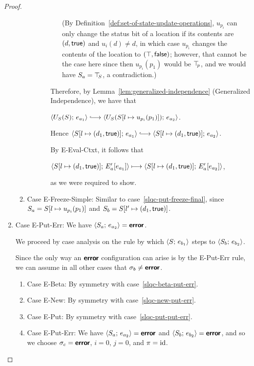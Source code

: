 \begin{proof}
\begin{enumerate}
\begin{enumerate}
\begin{itemize}
\begin{itemize}
\begin{itemize}
            (By Definition~\ref{def:set-of-state-update-operations},
            $u_{p_i}$ can only change the status bit of a location if
            its contents are $(d, \textsf{true})$ and $u_i(d) \neq
            d$, in which case $u_{p_i}$ changes the contents of the
            location to $(\top, \textsf{false})$; however, that
            cannot be the case here since then $u_{p_i}(p_1)$ would be
            $\top\hspace{-0.85mm}_{p}$, and we would have $S_a = \top\hspace{-0.85mm}_{S}$, a
            contradiction.)
          \end{itemize}
          Therefore, by Lemma~\ref{lem:generalized-independence}
          (Generalized Independence), we have that

          $\config{U_S(S)}{e_{a_1}} \parstepsto
          \config{U_S(\extSRaw{S}{l}{u_{p_i}(p_1)})}{e_{a_2}}$.

          Hence $\config{\extS{S}{l}{d_1}{\frozentrue}}{e_{a_1}}
          \parstepsto
          \config{\extS{S}{l}{d_1}{\frozentrue}}{e_{a_2}}$.

          By {\sc E-Eval-Ctxt}, it follows that

          $\langle S[l \mapsto (d_1, \textsf{true})];\, E'_a\hspace{-0.5mm}\left[e_{a_1}\right] \rangle
          \longmapsto
          \langle S[l \mapsto (d_1, \textsf{true})];\, E'_a\hspace{-0.5mm}\left[e_{a_2}\right] \rangle$,

          as we were required to show.
        \end{itemize}

      \end{itemize}

    \item \label{slqc-put-freeze-simple}Case {\sc E-Freeze-Simple}:
      Similar to case~\ref{slqc-put-freeze-final}, since $S_a =
      S[l \mapsto u_{p_i}(p_1)]$ and $S_b =
      S[l' \mapsto (d_1, \textsf{true})]$.

    \end{enumerate}
  \item Case {\sc E-Put-Err}: We have $\langle S_a;\, e_{a_2} \rangle =
    \textbf{\textsf{error}}$.

    We proceed by case analysis on the rule by which
    $\langle S;\, e_{b_1} \rangle$ steps to $\langle S_b;\, e_{b_2} \rangle$.

    Since the only way an $\textbf{\textsf{error}}$ configuration can arise is by the
    {\sc E-Put-Err} rule, we can assume in all other cases that
    $\sigma_b \neq \textbf{\textsf{error}}$.
    \begin{enumerate}
    \item \label{slqc-put-err-beta}Case {\sc E-Beta}: By symmetry with case~\ref{slqc-beta-put-err}.
    \item \label{slqc-put-err-new}Case {\sc E-New}: By symmetry with case~\ref{slqc-new-put-err}.
    \item \label{slqc-put-err-put}Case {\sc E-Put}: By symmetry with case~\ref{slqc-put-put-err}.
    \item \label{slqc-put-err-put-err}Case {\sc E-Put-Err}: We have
      $\langle S_a;\, e_{a_2} \rangle = \textbf{\textsf{error}}$ and $\langle S_b;\, e_{b_2} \rangle =
      \textbf{\textsf{error}}$, and so we choose $\sigma_c = \textbf{\textsf{error}}$, $i = 0$, $j = 0$,
      and $\pi = \mathrm{id}$.


\end{enumerate}
\end{enumerate}
\end{proof}

